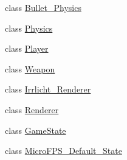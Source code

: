 \begin{DoxyCompactItemize}
class \hyperlink{class_micro_f_p_s_1_1_bullet___physics}{Bullet\_\-Physics}
\item 
class \hyperlink{class_micro_f_p_s_1_1_physics}{Physics}
\item 
class \hyperlink{class_micro_f_p_s_1_1_player}{Player}
\item 
class \hyperlink{class_micro_f_p_s_1_1_weapon}{Weapon}
\item 
class \hyperlink{class_micro_f_p_s_1_1_irrlicht___renderer}{Irrlicht\_\-Renderer}
\item 
class \hyperlink{class_micro_f_p_s_1_1_renderer}{Renderer}
\item 
class \hyperlink{class_micro_f_p_s_1_1_game_state}{GameState}
\item 
class \hyperlink{class_micro_f_p_s_1_1_micro_f_p_s___default___state}{MicroFPS\_\-Default\_\-State}
\end{DoxyCompactItemize}
